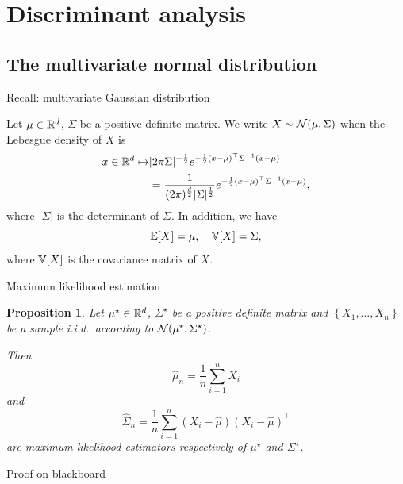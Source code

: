 \documentclass[xcolor={usenames,dvipsnames},handout]{beamer}
\newtheorem{prop}[theorem]{Proposition}
\begin{document}
\section{Discriminant analysis}


\subsection{The multivariate normal distribution}

\begin{frame}{Recall: multivariate Gaussian distribution}
	\begin{definition}
		Let $\mu \in \mathbb{R}^d$, $\Sigma$ be a positive definite matrix.
		We write $X \sim {\mathcal{N}}(\mu, \Sigma)$ when the Lebesgue density of $X$ is
	\begin{align*}
			x \in \mathbb{R}^d \mapsto  & |2\pi\Sigma|^{-\frac 12} e^{- \frac 12 (x-\mu)^\top \Sigma^{-1} (x-\mu)} \\
			&= \frac{1}{(2\pi)^{\frac d2} |\Sigma|^{\frac 12}} e^{- \frac 12 (x-\mu)^\top \Sigma^{-1} (x-\mu)},
	\end{align*}
		where $|\Sigma|$ is the determinant of $\Sigma$.
		In addition, we have
		$$
			\mathbb{E} [X] = \mu,
			\quad
			\mathbb{V}[X] = \Sigma,
		$$
		where $\mathbb{V}[X]$ is the covariance matrix of $X$.
	\end{definition}
	
\end{frame}

\begin{frame}{Maximum likelihood estimation}


	\begin{prop}
		Let $\mu^\star \in \mathbb{R}^d$, $\Sigma^\star$ be a positive definite matrix and $\left\{X_1, \dots, X_{n} \right\}$ be a sample i.i.d.\ according to ${\mathcal{N}}(\mu^\star, \Sigma^\star)$.

		Then
		$$
			\hat \mu_n = \frac{1}{n} \sum_{i=1}^{n} X_i
		$$
		and
		$$
			\hat \Sigma_n = \frac{1}{n} \sum_{i=1}^{n} (X_i - \hat \mu)(X_i - \hat \mu)^\top
		$$
		are maximum likelihood estimators respectively of $\mu^\star$ and $\Sigma^\star$.
	\end{prop}

\centering
{\color{Vert} Proof on blackboard}
	
\end{frame}
\end{document}
